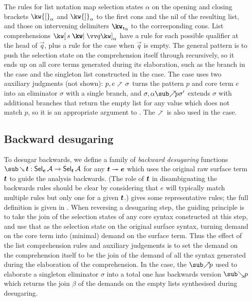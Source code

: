The rules for list notation map selection states $\alpha$ on the opening and closing brackets $\annot{\kw{[}}{\alpha}$ and $\annot{\kw{]}}{\alpha}$ to the first cons and the nil of the resulting list, and those on intervening delimiters $\annot{\comma}{\alpha}$ to the corresponding cons. List comprehensions $\annListComp{s}{\vec{q}}{\alpha}$ have a rule for each possible qualifier at the head of $\vec{q}$, plus a rule for the case when $\vec{q}$ is empty. The general pattern is to push the selection state on the comprehension itself through recursively, so it ends up on all core terms generated during its elaboration, such as the  branch in the  case and the singleton list constructed in the  case. The  case uses two auxiliary judgments (not shown): $p, e \clauseFwdR \sigma$ turns the pattern $p$ and core term $e$ into an eliminator $\sigma$ with a single branch, and $\totaliseFwd{\sigma}{\alpha}{p}{\sigma'}$ extends $\sigma$ with additional branches that return the empty list for any value which does not match $p$, so it is an appropriate argument to . The $\clauseFwdR$ is also used in the  case.

\subsection{Backward desugaring}

To desugar backwards, we define a family of \textit{backward desugaring} functions $\desugarBwdR{\raw{t}}: \Sel{\raw{e}}{A} \to \Sel{\raw{t}}{A}$ for any $\bm{t} \twoheadrightarrow \bm{e}$ which uses the original raw surface term $\bm{t}$ to guide the analysis backwards. (The role of $\bm{t}$ in disambiguating the backwards rules should be clear by considering that $e$ will typically match multiple rules but only one for a given $\bm{t}$.)  gives some representative rules; the full definition is {\ifappendices given in  \else \IncludedWithSupplementaryMaterial.\fi} When reversing a desugaring step, the guiding principle is to take the join of the selection states of any core syntax constructed at this step, and use that as the selection state on the original surface syntax, turning demand on the core term into (minimal) demand on the surface term. Thus the effect of the list comprehension rules and auxiliary judgements is to set the demand on the comprehension itself to be the join of the demand of all the syntax generated during the elaboration of the comprehension. In the  case, the $\totaliseFwdR{p}$ used to elaborate a singleton eliminator $\sigma$ into a total one has backwards version $\totaliseBwdR{p}$ which returns the join $\beta$ of the demands on the empty lists synthesised during desugaring.

